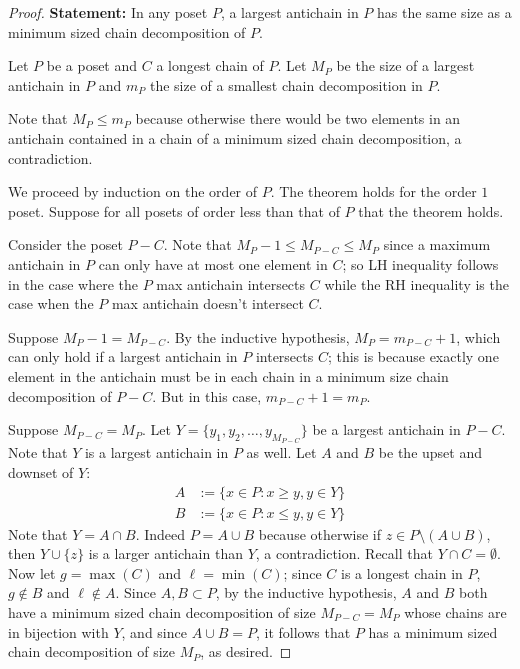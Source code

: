 \documentclass[12]{article}
\theoremstyle{definition}
\begin{document}
	\begin{proof}
		\textbf{Statement:} In any poset $P$, a largest antichain in $P$ has the same size as a minimum sized chain decomposition of $P$.
		
		Let $P$ be a poset and $C$ a longest chain of $P$.  Let $M_P$ be the size of a largest antichain in $P$ and $m_P$ the size of a smallest chain decomposition in $P$.
		
		Note that $M_P \leq m_P$ because otherwise there would be two elements in an antichain contained in a chain of a minimum sized chain decomposition, a contradiction.
		
		We proceed by induction on the order of $P$.  The theorem holds for the order $1$ poset.  Suppose for all posets of order less than that of $P$ that the theorem holds.
		
		Consider the poset $P-C$.  Note that $M_{P} -1 \leq M_{P-C} \leq M_{P}$ since a maximum antichain in $P$ can only have at most one element in $C$; so LH inequality follows in the case where the $P$ max antichain intersects $C$ while the RH inequality is the case when the $P$ max antichain doesn't intersect $C$.
		
		Suppose $M_{P}-1 = M_{P-C}$.  By the inductive hypothesis, $M_P = m_{P-C}+1$, which can only hold if a largest antichain in $P$ intersects $C$; this is because exactly one element in the antichain must be in each chain in a minimum size chain decomposition of $P-C$.  But in this case, $m_{P-C}+ 1 = m_{P}$.
		
		Suppose $M_{P-C} = M_P$.  Let $Y = \{y_1, y_2, \ldots, y_{M_{P-C}}\}$ be a largest antichain in $P-C$.  Note that $Y$ is a largest antichain in $P$ as well.  Let $A$ and $B$ be the upset and downset of $Y$:
		\begin{align*}
			A &:= \{x \in P: x \geq y, y \in Y\}	\\
			B &:= \{x \in P: x \leq y, y \in Y\}
		\end{align*}
		Note that $Y = A \cap B$.  Indeed $P = A \cup B$ because otherwise if $z \in P \setminus (A \cup B)$, then $Y \cup \{z\}$ is a larger antichain than $Y$, a contradiction.  Recall that $Y \cap C = \emptyset$.  Now let $g = \max(C)$ and $\ell = \min(C)$; since $C$ is a longest chain in $P$, $g \notin B$ and $\ell \notin A$.  Since $A, B \subset P$, by the inductive hypothesis, $A$ and $B$ both have a minimum sized chain decomposition of size $M_{P-C} = M_{P}$ whose chains are in bijection with $Y$, and since $A \cup B = P$, it follows that $P$ has a minimum sized chain decomposition of size $M_P$, as desired. \qedhere
	\end{proof}
	
\end{document}
